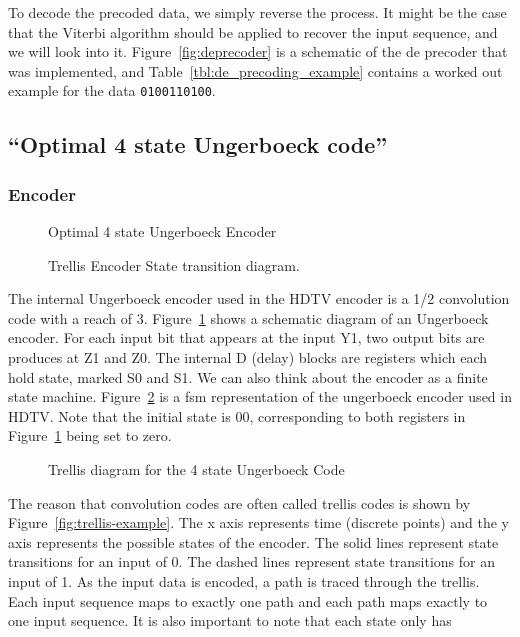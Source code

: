 \documentclass{article}
\begin{document}
To decode the precoded data, we simply reverse the process. It might be the case that 
the Viterbi algorithm should be applied to recover the input sequence, and we will
look into it. Figure~\ref{fig:deprecoder} is a schematic of the de precoder that was
implemented, and Table~\ref{tbl:de_precoding_example} contains a worked out example 
for the data \texttt{0100110100}.


\subsection{``Optimal 4 state Ungerboeck code''}

\subsubsection{Encoder}

\begin{figure}
\center
\epsfxsize=3.5in
\caption{Optimal 4 state Ungerboeck Encoder}
\label{fig:ungerboeck}
\end{figure}

\begin{figure}
\center
\epsfxsize=3.5in
\caption{Trellis Encoder State transition diagram.}
\label{fig:trellis-state-diagram}
\end{figure}

The internal Ungerboeck encoder used in the HDTV encoder is
a 1/2 convolution code with a reach of 3. Figure~\ref{fig:ungerboeck}
shows a schematic diagram of an Ungerboeck encoder. For each input bit
that appears at the input Y1, two output bits are produces at Z1 and Z0.
The internal D (delay) blocks are registers which each hold state, marked
S0 and S1. We can also think about the encoder as a finite state machine.
Figure~\ref{fig:trellis-state-diagram} is a fsm representation of the ungerboeck
encoder used in HDTV. Note that the initial state is 00, corresponding to 
both registers in Figure~\ref{fig:ungerboeck} being set to zero.

\begin{figure}
\center
\epsfxsize=5.5in
\caption{Trellis diagram for the 4 state Ungerboeck Code}
\label{fig:trellis-blank}
\end{figure}

The reason that convolution codes are often called trellis codes is shown by 
Figure~\ref{fig:trellis-example}. The x axis represents time (discrete points)
and the y axis represents the possible states of the encoder. The solid lines
represent state transitions for an input of 0. The dashed lines represent
state transitions for an input of 1. As the input
data is encoded, a path is traced through the trellis. Each input sequence maps 
to exactly one path and each path maps exactly to one input sequence. It
is also important to note that each state only has 
\end{document}
